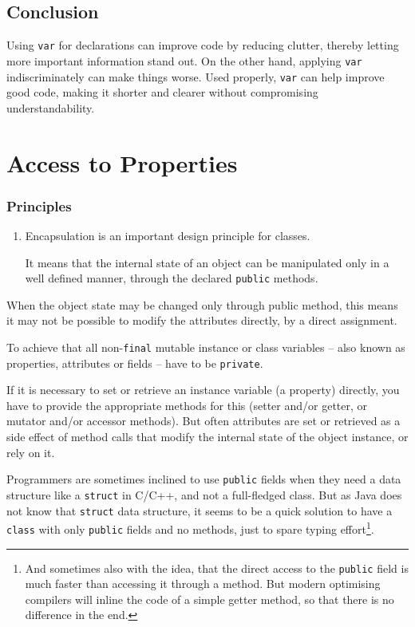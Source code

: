 \documentclass[11pt,a4paper, titlepage, parskip=half, headsepline, footsepline, cleardoublepage=current, headheight=1cm]{scrbook}
\begin{document}

\subsection{Conclusion}
Using \lstinline|var| for declarations can improve code by reducing clutter, thereby letting more important information stand out. On the other hand, applying \lstinline|var| indiscriminately can make things worse. Used properly, \lstinline|var| can help improve good code, making it shorter and clearer without compromising understandability.


\section{Access to Properties}

\subsubsection{Principles}
\begin{enumerate}[label=P\arabic*.]
\item{Encapsulation is an important design principle for classes.

It means that the internal state of an object can be manipulated only in a well defined manner, through the declared \lstinline|public| methods.}
\end{enumerate}

When the object state may be changed only through public method, this means it may not be possible to modify the attributes directly, by a direct assignment.

To achieve that all non-\lstinline|final| mutable instance or class variables – also known as properties, attributes or fields – have to be \lstinline|private|.

If it is necessary to set or retrieve an instance variable (a property) directly, you have to provide the appropriate methods for this (setter and/or getter, or mutator and/or accessor methods). But often attributes are set or retrieved as a side effect of method calls that modify the internal state of the object instance, or rely on it.

Programmers are sometimes inclined to use \lstinline|public| fields when they need a data structure like a \lstinline|struct| in C/C++, and not a full-fledged class. But as Java does not know that \lstinline|struct| data structure, it seems to be a quick solution to have a \lstinline|class| with only \lstinline|public| fields and no methods, just to spare typing effort\footnote{And sometimes also with the idea, that the direct access to the \lstinline|public| field is much faster than accessing it through a method. But modern optimising compilers will inline the code of a simple getter method, so that there is no difference in the end.}.
\end{document}
